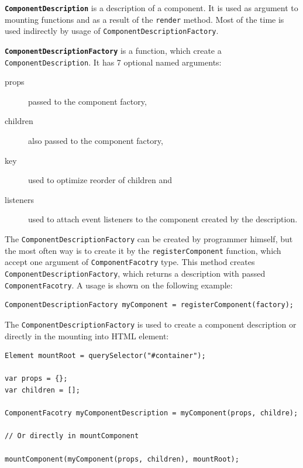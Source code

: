 \documentclass[oneside, 12pt]{book}
\begin{document}


  \textbf{\texttt{ComponentDescription}} is a description of a component. 
  It is used as argument to mounting functions and as a result of the \texttt{render} method.
  Most of the time is used indirectly by usage of \texttt{ComponentDescriptionFactory}.

  \textbf{\texttt{ComponentDescriptionFactory}} is a function, which create a \texttt{ComponentDescription}.
  It has 7 optional named arguments: 
  \begin{description}
    \item[props] passed to the component factory,
    \item[children] also passed to the component factory, 
    \item[key] used to optimize reorder of children and
    \item[listeners] used to attach event listeners to the component created by the description.
  \end{description}

  The \texttt{ComponentDescriptionFactory} can be created by programmer himself, 
  but the most often way is to create it by the \texttt{registerComponent} function, which accept one argument of \texttt{ComponentFacotry} type.
  This method creates \texttt{ComponentDescriptionFactory}, which returns a description with passed \texttt{ComponentFacotry}.
  A usage is shown on the following example:
\begin{verbatim}
ComponentDescriptionFactory myComponent = registerComponent(factory);
\end{verbatim}



  The \texttt{ComponentDescriptionFactory} is used to create a component description or directly in the mounting into HTML element:
\begin{verbatim}
Element mountRoot = querySelector("#container");

var props = {};
var children = [];

ComponentFacotry myComponentDescription = myComponent(props, childre);

// Or directly in mountComponent

mountComponent(myComponent(props, children), mountRoot);
\end{verbatim}
\end{document}
